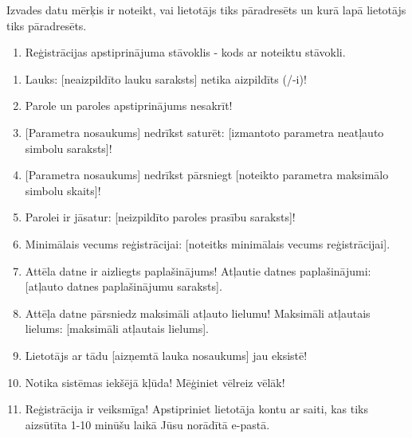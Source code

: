 {
	Izvades datu mērķis ir noteikt, vai lietotājs tiks pāradresēts un kurā lapā lietotājs tiks pāradresēts.
	\begin{enumerate}
		\item Reģistrācijas apstiprinājuma stāvoklis - kods ar noteiktu stāvokli.
	\end{enumerate}
}
{
	\begin{enumerate}
		\item Lauks: [neaizpildīto lauku saraksts] netika aizpildīts (/-i)!
		\item Parole un paroles apstiprinājums nesakrīt!
		\item {}[Parametra nosaukums] nedrīkst saturēt: [izmantoto parametra neatļauto simbolu saraksts]!
		\item {}[Parametra nosaukums] nedrīkst pārsniegt [noteikto parametra maksimālo simbolu skaits]!
		\item Parolei ir jāsatur: [neizpildīto paroles prasību saraksts]!
		\item Minimālais vecums reģistrācijai: [noteitks minimālais vecums reģistrācijai].
		\item Attēla datne ir aizliegts paplašinājums! Atļautie datnes paplašinājumi: [atļauto datnes paplašinājumu saraksts].
		\item Attēļa datne pārsniedz maksimāli atļauto lielumu! Maksimāli atļautais lielums: [maksimāli atļautais lielums].
		\item Lietotājs ar tādu [aizņemtā lauka nosaukums] jau eksistē!
		\item Notika sistēmas iekšējā kļūda! Mēģiniet vēlreiz vēlāk!
		\item Reģistrācija ir veiksmīga! Apstipriniet lietotāja kontu ar saiti, kas tiks aizsūtīta 1-10 minūšu laikā Jūsu norādītā e-pastā.
	\end{enumerate}
}
